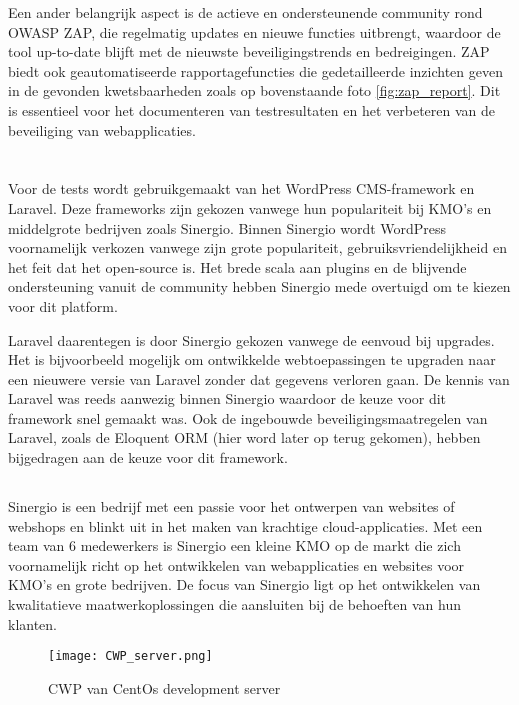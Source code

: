 Een ander belangrijk aspect is de actieve en ondersteunende community 
rond OWASP ZAP, die regelmatig updates en nieuwe functies uitbrengt, waardoor de tool up-to-date blijft met de nieuwste 
beveiligingstrends en bedreigingen. ZAP biedt ook geautomatiseerde rapportagefuncties die gedetailleerde inzichten geven 
in de gevonden kwetsbaarheden zoals op bovenstaande foto \ref{fig:zap_report}. Dit is essentieel voor het documenteren van testresultaten en het verbeteren van de beveiliging 
van webapplicaties. 

\section{}
Voor de tests wordt gebruikgemaakt van het WordPress CMS-framework en Laravel. Deze frameworks zijn gekozen vanwege hun 
populariteit bij KMO's en middelgrote bedrijven zoals Sinergio. Binnen Sinergio wordt WordPress voornamelijk verkozen vanwege 
zijn grote populariteit, gebruiksvriendelijkheid en het feit dat het open-source is. Het brede scala aan plugins en de 
blijvende ondersteuning vanuit de community hebben Sinergio mede overtuigd om te kiezen voor dit platform. 


Laravel daarentegen is door Sinergio gekozen vanwege de eenvoud bij upgrades. Het is bijvoorbeeld mogelijk om ontwikkelde webtoepassingen 
te upgraden naar een nieuwere versie van Laravel zonder dat gegevens verloren gaan. De kennis van Laravel was 
reeds aanwezig binnen Sinergio waardoor de keuze voor dit framework snel gemaakt was. Ook de ingebouwde beveiligingsmaatregelen 
van Laravel, zoals de Eloquent ORM (hier word later op terug gekomen), hebben bijgedragen aan de keuze voor dit framework.

\subsection{}
Sinergio is een bedrijf met een passie voor het ontwerpen van websites of webshops en blinkt 
uit in het maken van krachtige cloud-applicaties. Met een team van 6 medewerkers is Sinergio een kleine KMO op de markt 
die zich voornamelijk richt op het ontwikkelen van webapplicaties en websites voor KMO's en grote bedrijven. De focus 
van Sinergio ligt op het ontwikkelen van kwalitatieve maatwerkoplossingen die aansluiten bij de behoeften van hun klanten.

\begin{figure}
    \centering
    \texttt{[image: CWP\_server.png]}
    \caption[CWP van CentOs development server]{CWP van CentOs development server}
    \label{fig:centos_server}
\end{figure}
